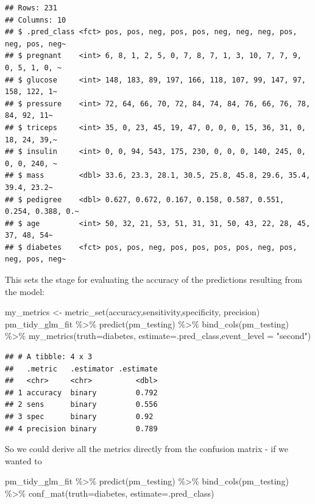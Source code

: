 \documentclass[
]{article}
\newenvironment{Shaded}{\begin{snugshade}}{\end{snugshade}}
\newcommand{\AttributeTok}[1]{\textcolor[rgb]{0.77,0.63,0.00}{#1}}
\newcommand{\FunctionTok}[1]{\textcolor[rgb]{0.00,0.00,0.00}{#1}}
\newcommand{\NormalTok}[1]{#1}
\newcommand{\OtherTok}[1]{\textcolor[rgb]{0.56,0.35,0.01}{#1}}
\newcommand{\SpecialCharTok}[1]{\textcolor[rgb]{0.00,0.00,0.00}{#1}}
\newcommand{\StringTok}[1]{\textcolor[rgb]{0.31,0.60,0.02}{#1}}
\begin{document}
\begin{verbatim}
## Rows: 231
## Columns: 10
## $ .pred_class <fct> pos, pos, neg, pos, pos, neg, neg, neg, pos, neg, pos, neg~
## $ pregnant    <int> 6, 8, 1, 2, 5, 0, 7, 8, 7, 1, 3, 10, 7, 7, 9, 0, 5, 1, 0, ~
## $ glucose     <int> 148, 183, 89, 197, 166, 118, 107, 99, 147, 97, 158, 122, 1~
## $ pressure    <int> 72, 64, 66, 70, 72, 84, 74, 84, 76, 66, 76, 78, 84, 92, 11~
## $ triceps     <int> 35, 0, 23, 45, 19, 47, 0, 0, 0, 15, 36, 31, 0, 18, 24, 39,~
## $ insulin     <int> 0, 0, 94, 543, 175, 230, 0, 0, 0, 140, 245, 0, 0, 0, 240, ~
## $ mass        <dbl> 33.6, 23.3, 28.1, 30.5, 25.8, 45.8, 29.6, 35.4, 39.4, 23.2~
## $ pedigree    <dbl> 0.627, 0.672, 0.167, 0.158, 0.587, 0.551, 0.254, 0.388, 0.~
## $ age         <int> 50, 32, 21, 53, 51, 31, 31, 50, 43, 22, 28, 45, 37, 48, 54~
## $ diabetes    <fct> pos, pos, neg, pos, pos, pos, pos, neg, pos, neg, pos, neg~
\end{verbatim}

This sets the stage for evaluating the accuracy of the predictions
resulting from the model:

\begin{Shaded}
\begin{Highlighting}[]
\NormalTok{my\_metrics }\OtherTok{\textless{}{-}} \FunctionTok{metric\_set}\NormalTok{(accuracy,sensitivity,specificity, precision)}
\NormalTok{pm\_tidy\_glm\_fit }\SpecialCharTok{\%\textgreater{}\%}
  \FunctionTok{predict}\NormalTok{(pm\_testing) }\SpecialCharTok{\%\textgreater{}\%}
  \FunctionTok{bind\_cols}\NormalTok{(pm\_testing) }\SpecialCharTok{\%\textgreater{}\%}
  \FunctionTok{my\_metrics}\NormalTok{(}\AttributeTok{truth=}\NormalTok{diabetes, }\AttributeTok{estimate=}\NormalTok{.pred\_class,}\AttributeTok{event\_level =} \StringTok{"second"}\NormalTok{)}
\end{Highlighting}
\end{Shaded}

\begin{verbatim}
## # A tibble: 4 x 3
##   .metric   .estimator .estimate
##   <chr>     <chr>          <dbl>
## 1 accuracy  binary         0.792
## 2 sens      binary         0.556
## 3 spec      binary         0.92 
## 4 precision binary         0.789
\end{verbatim}

So we could derive all the metrics directly from the confusion matrix -
if we wanted to

\begin{Shaded}
\begin{Highlighting}[]
\NormalTok{pm\_tidy\_glm\_fit }\SpecialCharTok{\%\textgreater{}\%}
  \FunctionTok{predict}\NormalTok{(pm\_testing) }\SpecialCharTok{\%\textgreater{}\%}
  \FunctionTok{bind\_cols}\NormalTok{(pm\_testing) }\SpecialCharTok{\%\textgreater{}\%}
  \FunctionTok{conf\_mat}\NormalTok{(}\AttributeTok{truth=}\NormalTok{diabetes, }\AttributeTok{estimate=}\NormalTok{.pred\_class)}
\end{Highlighting}
\end{Shaded}
\end{document}
